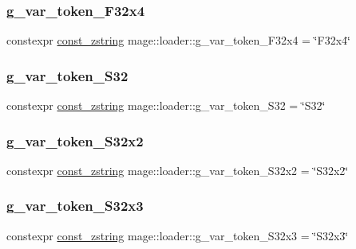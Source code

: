 \subsubsection{\texorpdfstring{g\+\_\+var\+\_\+token\+\_\+\+F32x4}{g\_var\_token\_F32x4}}
{\footnotesize\ttfamily constexpr \mbox{\hyperlink{namespacemage_abfd9206dc607ceb5d13ec68bf075a5c0}{const\+\_\+zstring}} mage\+::loader\+::g\+\_\+var\+\_\+token\+\_\+\+F32x4 = \char`\"{}F32x4\char`\"{}}

\mbox{\label{namespacemage_1_1loader_a75eebbbfc199cf7c56c9fd3aca78daf6}} 
\subsubsection{\texorpdfstring{g\+\_\+var\+\_\+token\+\_\+\+S32}{g\_var\_token\_S32}}
{\footnotesize\ttfamily constexpr \mbox{\hyperlink{namespacemage_abfd9206dc607ceb5d13ec68bf075a5c0}{const\+\_\+zstring}} mage\+::loader\+::g\+\_\+var\+\_\+token\+\_\+\+S32 = \char`\"{}S32\char`\"{}}

\mbox{\label{namespacemage_1_1loader_a299bf95167881649611ba55fd3226fbd}} 
\subsubsection{\texorpdfstring{g\+\_\+var\+\_\+token\+\_\+\+S32x2}{g\_var\_token\_S32x2}}
{\footnotesize\ttfamily constexpr \mbox{\hyperlink{namespacemage_abfd9206dc607ceb5d13ec68bf075a5c0}{const\+\_\+zstring}} mage\+::loader\+::g\+\_\+var\+\_\+token\+\_\+\+S32x2 = \char`\"{}S32x2\char`\"{}}

\mbox{\label{namespacemage_1_1loader_ace186c82d08eb904df8f4ad54cc36e47}} 
\subsubsection{\texorpdfstring{g\+\_\+var\+\_\+token\+\_\+\+S32x3}{g\_var\_token\_S32x3}}
{\footnotesize\ttfamily constexpr \mbox{\hyperlink{namespacemage_abfd9206dc607ceb5d13ec68bf075a5c0}{const\+\_\+zstring}} mage\+::loader\+::g\+\_\+var\+\_\+token\+\_\+\+S32x3 = \char`\"{}S32x3\char`\"{}}

